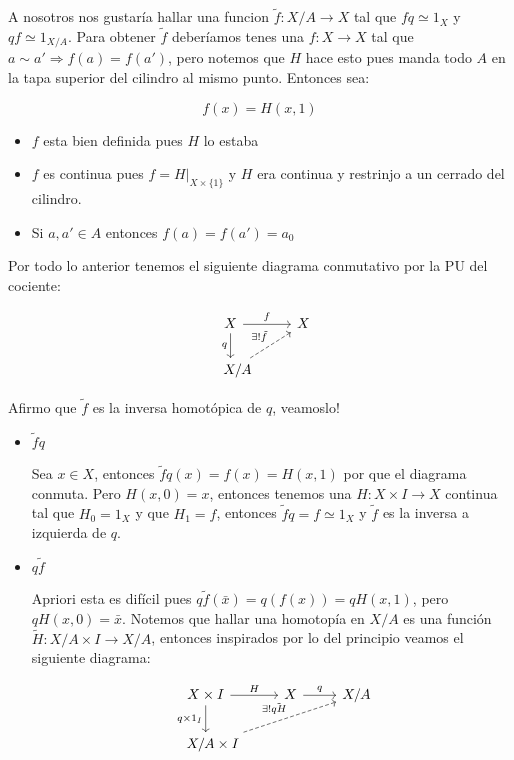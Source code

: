 \documentclass[11pt]{article}
\newenvironment{proof}[1][Demostraci\'on]{\begin{trivlist}
\item[\hskip \labelsep {\bfseries #1}]}{\end{trivlist}}
\begin{document}
\begin{enumerate}
\begin{proof}

A nosotros nos gustar\'ia hallar una funcion $\tilde{f}: X/A \rightarrow X$ tal que $fq \simeq 1_X$ y $qf \simeq 1_{X/A}$. Para obtener $\tilde{f}$ deber\'iamos tenes una $f:X \rightarrow X$ tal que $a \sim a' \Longrightarrow f(a) = f(a')$, pero notemos que $H$ hace esto pues manda todo $A$ en la tapa superior del cilindro al mismo punto. Entonces sea:

$$f (x) = H(x,1)$$

\begin{itemize}
\item $f$ esta bien definida pues $H$ lo estaba
\item $f$ es continua pues $f=H|_{X \times \{1\}}$ y $H$ era continua y restrinjo a un cerrado del cilindro.
\item Si $a,a' \in A$ entonces $f(a)=f(a')=a_0$
\end{itemize}

Por todo lo anterior tenemos el siguiente diagrama conmutativo por la PU del cociente:

\[
\begin{tikzcd}
X \arrow{r}{f} \arrow[swap]{d}{q} & X \\ \quad 
X/A \arrow[dashed]{ur}{\exists! \tilde{f}}
\end{tikzcd}
\]

Afirmo que $\tilde{f}$ es la inversa homot\'opica de $q$, veamoslo!

\begin{itemize}
\item {$\tilde{f}q$}

Sea $x \in X$, entonces $\tilde{f}q(x) = f(x) = H(x,1)$ por que el diagrama conmuta. Pero $H(x,0) = x$, entonces tenemos una $H:X \times I \rightarrow X$ continua tal que $H_0 = 1_X$ y que $H_1 = f$, entonces $\tilde{f}q = f \simeq 1_X$ y $\tilde{f}$ es la inversa a izquierda de $q$.

\item {$q\tilde{f}$}

Apriori esta es dif\'icil pues $q\tilde{f}(\bar{x}) = q(f(x)) = qH(x,1)$, pero $qH(x,0) = \bar{x}$. Notemos que hallar una homotop\'ia en $X/A$ es una funci\'on $\tilde{H}:X/A \times I \rightarrow X/A$, entonces inspirados por lo del principio veamos el siguiente diagrama:

\[
\begin{tikzcd}
X \times I \arrow{r}{H} \arrow[swap]{d}{q \times 1_I} & X \arrow{r}{q} & X/A \\ \quad 
X/A \times I \arrow[dashed]{urr}{\exists ! \tilde{qH}}
\end{tikzcd}
\]


\end{itemize}
\end{proof}
\end{enumerate}
\end{document}
